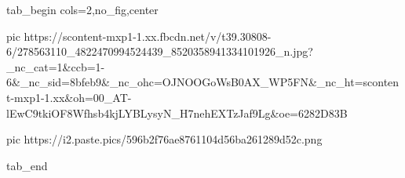  
 
 
 
 

\ifcmt
  tab_begin cols=2,no_fig,center

     pic https://scontent-mxp1-1.xx.fbcdn.net/v/t39.30808-6/278563110_4822470994524439_8520358941334101926_n.jpg?_nc_cat=1&ccb=1-6&_nc_sid=8bfeb9&_nc_ohc=OJNOOGoWsB0AX_WP5FN&_nc_ht=scontent-mxp1-1.xx&oh=00_AT-lEwC9tkiOF8Wfhsb4kjLYBLysyN_H7nehEXTzJaf9Lg&oe=6282D83B

		 pic https://i2.paste.pics/596b2f76ae8761104d56ba261289d52c.png

  tab_end
\fi
